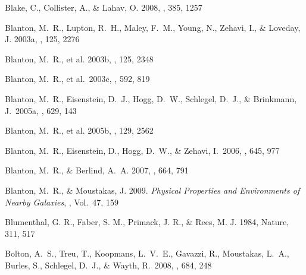 \documentclass[]{emulateapj}
\begin{document}
\begin{thebibliography}{999}
Blake, C., Collister, A., \& Lahav, O. 2008,
\mnras, 385, 1257

Blanton, M.\ R., Lupton, R.\ H., Maley, F.\ M., Young, N.,
Zehavi, I., \& Loveday, J. 2003a, \aj, 125, 2276

Blanton, M.\ R., et al. 2003b, \aj, 125, 2348 

Blanton, M.\ R., et al.\ 2003c, \apj, 592, 819 


Blanton, M.\ R., Eisenstein, D.\ J., Hogg, D.\ W., Schlegel, D.\ J., \&
Brinkmann, J.\ 2005a, 
\apj, 629, 143

Blanton, M.\ R., et al. 2005b,
\aj, 129, 2562 

Blanton, M.~R., Eisenstein, D., Hogg, D.~W., 
\& Zehavi, I.\ 2006, \apj, 645, 977 

Blanton, M.\ R., \& Berlind, A.\ A. 2007,
\apj, 664, 791

Blanton, M.\ R., \& Moustakas, J. 2009.
{\it Physical Properties and Environments of Nearby Galaxies},
\araa, Vol.\ 47, 159

Blumenthal, G. R., Faber, S. M., Primack, J. R., \& Rees, M. J. 1984,
Nature, 311, 517

Bolton, A.~S., Treu, T., Koopmans, L.~V.~E., Gavazzi, R., Moustakas, L.~A.,
Burles, S., Schlegel, D.~J., \& Wayth, R.\ 2008, \apj, 684, 248


\end{thebibliography}
\end{document}
